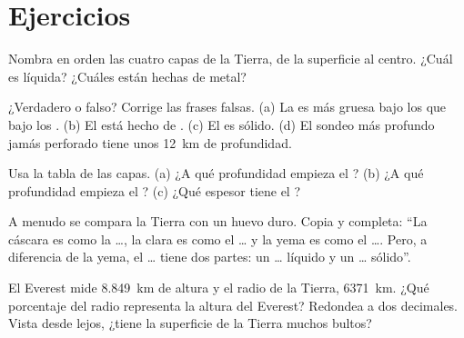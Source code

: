 \section{Ejercicios}

\begin{exercise}[$\star$]\label{exo:g6:inside-the-earth:1}
Nombra en orden las cuatro capas de la Tierra, de la superficie al centro.
¿Cuál es líquida? ¿Cuáles están hechas de metal?
\end{exercise}

\begin{exercise}[$\star$]\label{exo:g6:inside-the-earth:2}
¿Verdadero o falso? Corrige las frases falsas.
(a) La  es más gruesa bajo los  que bajo los .
(b) El  está hecho de .
(c) El  es sólido.
(d) El sondeo más profundo jamás perforado tiene unos 12~km de profundidad.
\end{exercise}

\begin{exercise}[$\star$]\label{exo:g6:inside-the-earth:3}
Usa la tabla de las capas. (a) ¿A qué profundidad empieza el ?
(b) ¿A qué profundidad empieza el ? (c) ¿Qué espesor tiene el
?
\end{exercise}

\begin{exercise}[$\star$]\label{exo:g6:inside-the-earth:4}
A menudo se compara la Tierra con un huevo duro. Copia y completa: ``La
cáscara es como la \ldots, la clara es como el \ldots{} y la yema es como
el \ldots{}. Pero, a diferencia de la yema, el \ldots{} tiene dos partes:
un \ldots{} líquido y un \ldots{} sólido''.
\end{exercise}

\begin{exercise}[$\star\star$]\label{exo:g6:inside-the-earth:5}
El Everest mide 8.849~km de altura y el radio de la Tierra, 6371~km. ¿Qué
porcentaje del radio representa la altura del Everest? Redondea a dos
decimales. Vista desde lejos, ¿tiene la superficie de la Tierra muchos
bultos?
\end{exercise}

